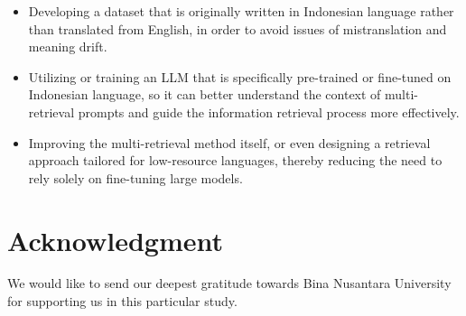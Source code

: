 \documentclass[times]{iapress}
\begin{document}
\begin{itemize}
    \item Developing a dataset that is originally written in Indonesian language rather than translated from English, in order to avoid issues of mistranslation and meaning drift.
    \item Utilizing or training an LLM that is specifically pre-trained or fine-tuned on Indonesian language, so it can better understand the context of multi-retrieval prompts and guide the information retrieval process more effectively.
    \item Improving the multi-retrieval method itself, or even designing a retrieval approach tailored for low-resource languages, thereby reducing the need to rely solely on fine-tuning large models.
\end{itemize}

\section*{Acknowledgment}
We would like to send our deepest gratitude towards Bina Nusantara University for supporting us in this particular study.








\end{document}
